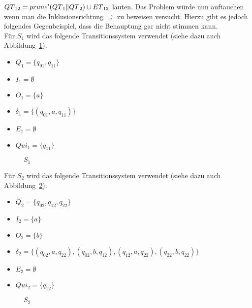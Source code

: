 $QT{}_{12}=prune' (QT{}_1\|QT{}_2)\cup ET{}_{12}$ lauten. Das Problem
würde nun auftauchen wenn man die Inklusionsrichtung $\supseteq$ zu beweisen
versucht. Hierzu gibt es jedoch folgendes Gegenbeispiel, dass die Behauptung
gar nicht stimmen kann.\\
Für $S_1$ wird das folgende Transitionssystem verwendet (siehe dazu auch
Abbildung~\ref{S1}):
\begin{itemize}
  \item $Q_1=\{q_{01}, q_{11}\}$
  \item $I_1=\emptyset$
  \item $O_1=\{a\}$
  \item $\delta _1 = \{(q_{01},a,q_{11})\}$
  \item $E_1=\emptyset$
  \item $Qui_1=\{q_{11}\}$
\end{itemize}
\begin{figure} [h!tbp]
\begin{center}
  \caption{$S_1$}
  \label{S1}
\end{center}
\end{figure}
Für $S_2$ wird das folgende Transitionssystem verwendet (siehe dazu auch
Abbildung~\ref{S2}):
\begin{itemize}
  \item $Q_2=\{q_{02}, q_{12}, q_{22}\}$
  \item $I_2=\{a\}$
  \item $O_2=\{b\}$
  \item $\delta _2 = \{(q_{02},a,q_{22}), (q_{02},b,q_{12}), (q_{12},a,q_{22}),
    (q_{22},b,q_{22})\}$
  \item $E_2=\emptyset$
  \item $Qui_2=\{q_{12}\}$
\end{itemize}
\begin{figure} [h!tbp]
\begin{center}
  \caption{$S_2$}
  \label{S2}
\end{center}
\end{figure}
